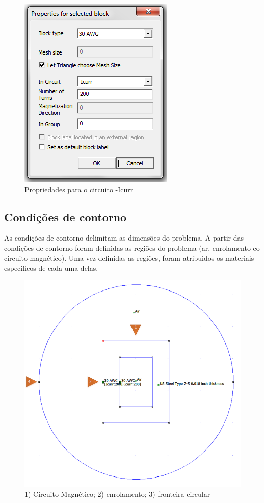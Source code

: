 \begin{figure}[H]
\centering
\includegraphics[scale=1]{img/circ_2.png}
\caption[Propriedades para o circuito -Icurr]{Propriedades para o circuito -Icurr}
\label{icurr_m}
\end{figure}

\subsection{Condições de contorno}
As condições de contorno delimitam as dimensões do problema. A partir das condições de contorno foram definidas as regiões do problema (ar, enrolamento eo circuito magnético). Uma vez definidas as regiões, foram atribuidos os materiais específicos de cada uma delas.

\begin{figure}[H]
\centering
\includegraphics[scale=0.65]{img/circ_mag.png}
\caption[Circuito magnético, enrolamento, fronteira]{1) Circuito Magnético; 2) enrolamento; 3) fronteira circular}
\label{circ_mag}
\end{figure}
